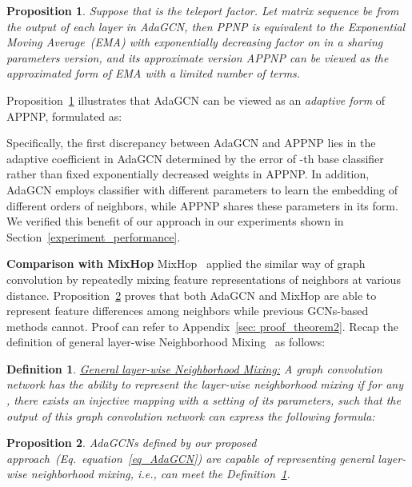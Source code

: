 \documentclass{article} \usepackage{iclr2021_conference,times}
\def\eqref#1{equation~\ref{#1}}
\newtheorem{defn}{Definition}
\newtheorem{prop}{Proposition}
\begin{document}
\begin{prop}\label{theorem:PPNP}
	Suppose that  is the teleport factor. Let matrix sequence  be from the output of each layer  in AdaGCN, then PPNP is equivalent to the Exponential Moving Average~(EMA) with exponentially decreasing factor  on  in a sharing parameters version, and its approximate version APPNP can be viewed as the approximated form of EMA with a limited number of terms.
\end{prop}

Proposition~\ref{theorem:PPNP} illustrates that AdaGCN can be viewed as an \textit{adaptive form} of APPNP, formulated as:

Specifically, the first discrepancy between AdaGCN and APPNP lies in the adaptive coefficient  in AdaGCN determined by the error of -th base classifier  rather than fixed exponentially decreased weights in APPNP. In addition, AdaGCN employs classifier  with different parameters to learn the embedding of different orders of neighbors, while APPNP shares these parameters in its form. We verified this benefit of our approach in our experiments shown in Section~\ref{experiment_performance}.

\textbf{Comparison with MixHop} MixHop~\citep{abu2019mixhop} applied the similar way of graph convolution by repeatedly mixing feature representations of neighbors at various distance. Proposition~\ref{theorem:mixhop} proves that both AdaGCN and MixHop are able to represent feature differences among neighbors while previous GCNs-based methods cannot. Proof can refer to Appendix~\ref{sec: proof_theorem2}. Recap the definition of general layer-wise Neighborhood Mixing~\citep{abu2019mixhop} as follows:
\begin{defn}{\underline{General layer-wise Neighborhood Mixing:}}
	\label{defn:mixhop}
	A graph convolution network has the ability to represent the layer-wise neighborhood mixing if for any , there exists an injective mapping  with a setting of its parameters, such that the output of this graph convolution network can express the following formula:
	
\end{defn}

\begin{prop}\label{theorem:mixhop}
	AdaGCNs defined by our proposed approach~(Eq.~\eqref{eq_AdaGCN}) are capable of representing general layer-wise neighborhood mixing, i.e., can meet the Definition~\ref{defn:mixhop}.
\end{prop}
\end{document}
